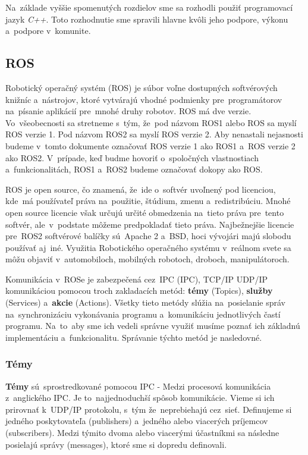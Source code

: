Na~základe vyššie spomenutých rozdielov sme sa rozhodli použiť programovací jazyk \textit{C++}. Toto rozhodnutie sme spravili
hlavne kvôli jeho podpore, výkonu a~podpore v~komunite.

\subsection{ROS}
\label{sec:ros}

Robotický operačný systém (\acrlong{ROS}) je súbor voľne dostupných softvérových knižníc a~nástrojov, ktoré vytvárajú
vhodné podmienky pre~programátorov na~písanie aplikácií pre~mnohé druhy robotov. ROS má dve verzie. Vo~všeobecnosti sa stretneme
s~tým, že~pod názvom ROS1 alebo ROS sa myslí ROS verzie 1. Pod názvom ROS2 sa myslí ROS verzie 2. Aby nenastali nejasnosti
budeme v~tomto dokumente označovať ROS verzie 1 ako ROS1 a~ROS verzie 2 ako ROS2. V~prípade, keď budme hovoriť o~spoločných
vlastnostiach a~funkcionalitách, ROS1 a~ROS2 budeme označovať dokopy ako ROS.

ROS je open source, čo znamená, že~ide o~softvér uvoľnený pod licenciou, kde~má používateľ práva na~použitie,
štúdium, zmenu a~redistribúciu. Mnohé open source licencie však určujú určité obmedzenia na~tieto práva pre~tento softvér,
ale~v~podstate môžeme predpokladať tieto práva. Najbežnejšie licencie pre~ROS2 softvérové balíčky sú~Apache 2 a~BSD,
hoci vývojári majú slobodu používať aj~iné. \cite{ROS2book} Využitia Robotického operačného systému v~reálnom svete sa môžu
objaviť v~automobiloch, mobilných robotoch, droboch, manipulátoroch.

\label{sec:zakladne_pojmy}

\noindent Komunikácia v~ROSe je zabezpečená cez~IPC (\acrlong{IPC}), TCP/IP UDP/IP komunikáciou pomocou troch zakladacích metód:
\textbf{témy} (Topics), \textbf{služby} (Services) a~\textbf{akcie} (Actions).
Všetky tieto metódy slúžia na~posielanie správ na~synchronizáciu vykonávania programu a~komunikáciu jednotlivých častí programu.
Na~to~aby sme ich vedeli správne využiť musíme poznať ich základnú implementáciu a~funkcionalitu. Správanie týchto metód je nasledovné.

\subsubsection{Témy}
\label{sec:topic}

	\textbf {Témy} sú~sprostredkované pomocou IPC - Medzi procesová komunikácia z~anglického \acrlong{IPC}. Je to~najjednoduchší spôsob
	komunikácie. Vieme si ich prirovnať k~UDP/IP protokolu, s~tým že~neprebiehajú cez~sieť. Definujeme si jedného poskytovateľa (publishers)
	a~jedného alebo viacerých príjemcov (subscribers). Medzi týmito dvoma alebo viacerými účastníkmi sa následne posielajú správy (messages),
	ktoré sme si dopredu definovali.

